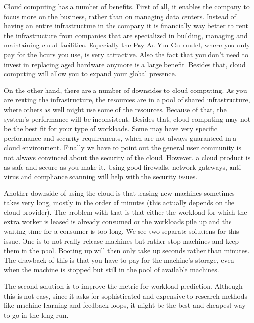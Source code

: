 \documentclass{stylesheet}
\begin{document}
Cloud computing has a number of benefits. First of all, it enables the company to focus more on the business, rather than on managing data centers. Instead of having an entire infrastructure in the company it is financially way better to rent the infrastructure from companies that are specialized in building, managing and maintaining cloud facilities. Especially the Pay As You Go model, where you only pay for the hours you use, is very attractive. Also the fact that you don't need to invest in replacing aged hardware anymore is a large benefit. Besides that, cloud computing will allow you to expand your global presence.

On the other hand, there are a number of downsides to cloud computing. As you are renting the infrastructure, the resources are in a pool of shared infrastructure, where others as well might use some of the resources. Because of that, the system's performance will be inconsistent. Besides that, cloud computing may not be the best fit for your type of workloads. Some may have very specific performance and security requirements, which are not always guaranteed in a cloud environment. Finally we have to point out the general user community is not always convinced about the security of the cloud. However, a cloud product is as safe and secure as you make it. Using good firewalls, network gateways, anti virus and compliance scanning will help with the security issues.

Another downside of using the cloud is that leasing new machines sometimes takes very long, mostly in the order of minutes (this actually depends on the cloud provider). The problem with that is that either the workload for which the extra worker is leased is already consumed or the workloads pile up and the waiting time for a consumer is too long. We see two separate solutions for this issue. One is to not really release machines but rather stop machines and keep them in the pool. Booting up will then only take up seconds rather than minutes. The drawback of this is that you have to pay for the machine's storage, even when the machine is stopped but still in the pool of available machines.

The second solution is to improve the metric for workload prediction. Although this is not easy, since it asks for sophisticated and expensive to research methods like machine learning and feedback loops, it might be the best and cheapest way to go in the long run.



\end{document}

